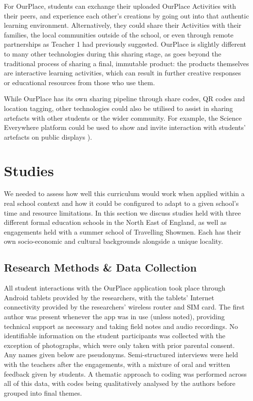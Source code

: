 For OurPlace, students can exchange their uploaded OurPlace Activities with their peers, and experience each other's creations by going out into that authentic learning environment. Alternatively, they could share their Activities with their families, the local communities outside of the school, or even through remote partnerships as Teacher 1 had previously suggested. OurPlace is slightly different to many other technologies during this sharing stage, as goes beyond the traditional process of sharing a final, immutable product: the products themselves are interactive learning activities, which can result in further creative responses or educational resources from those who use them. 

While OurPlace has its own sharing pipeline through share codes, QR codes and location tagging, other technologies could also be utilised to assist in sharing artefacts with other students or the wider community. For example, the Science Everywhere platform could be used to show and invite interaction with students' artefacts on public displays \citep{ahn2018}).

\section{Studies}

We needed to assess how well this curriculum would work when applied within a real school context and how it could be configured to adapt to a given school's time and resource limitations. In this section we discuss studies held with three different formal education schools in the North East of England, as well as engagements held with a summer school of Travelling Showmen. Each has their own socio-economic and cultural backgrounds alongside a unique locality.

\subsection{Research Methods \& Data Collection}

All student interactions with the OurPlace application took place through Android tablets provided by the researchers, with the tablets' Internet connectivity provided by the researchers' wireless router and SIM card. The first author was present whenever the app was in use (unless noted), providing technical support as necessary and taking field notes and audio recordings. No identifiable information on the student participants was collected with the exception of photographs, which were only taken with prior parental consent. Any names given below are pseudonyms. Semi-structured interviews were held with the teachers after the engagements, with a mixture of oral and written feedback given by students. A thematic approach to coding was performed across all of this data, with codes being qualitatively analysed by the authors before grouped into final themes.

